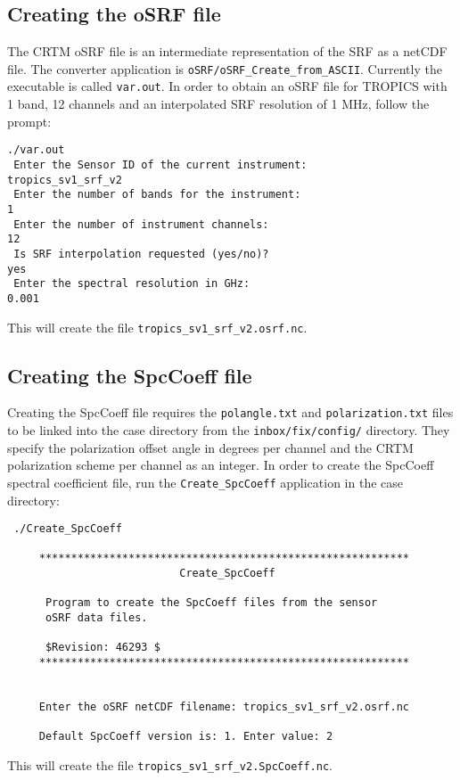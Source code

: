 \subsection{Creating the oSRF file}
The CRTM oSRF file is an intermediate representation of the SRF as a netCDF file. The converter application is \verb|oSRF/oSRF_Create_from_ASCII|.
Currently the executable is called \verb|var.out|. In order to obtain an oSRF file for TROPICS with 1 band, 12 channels and an interpolated SRF resolution of 1 MHz, follow the prompt:
\begin{verbatim}
./var.out 
 Enter the Sensor ID of the current instrument: 
tropics_sv1_srf_v2
 Enter the number of bands for the instrument: 
1
 Enter the number of instrument channels: 
12
 Is SRF interpolation requested (yes/no)?
yes 
 Enter the spectral resolution in GHz: 
0.001
\end{verbatim}
This will create the file \verb|tropics_sv1_srf_v2.osrf.nc|.

\subsection{Creating the SpcCoeff file}
Creating the SpcCoeff file requires the \verb|polangle.txt| and \verb|polarization.txt| files to be linked into the case directory from the \verb|inbox/fix/config/| directory.
They specify the polarization offset angle in degrees per channel and the CRTM polarization scheme per channel as an integer.
In order to create the SpcCoeff spectral coefficient file, run the \verb|Create_SpcCoeff| application in the case directory:
\begin{verbatim}
 ./Create_SpcCoeff 

     **********************************************************
                           Create_SpcCoeff

      Program to create the SpcCoeff files from the sensor 
      oSRF data files.

      $Revision: 46293 $
     **********************************************************


     Enter the oSRF netCDF filename: tropics_sv1_srf_v2.osrf.nc

     Default SpcCoeff version is: 1. Enter value: 2

\end{verbatim}
This will create the file \verb|tropics_sv1_srf_v2.SpcCoeff.nc|.

